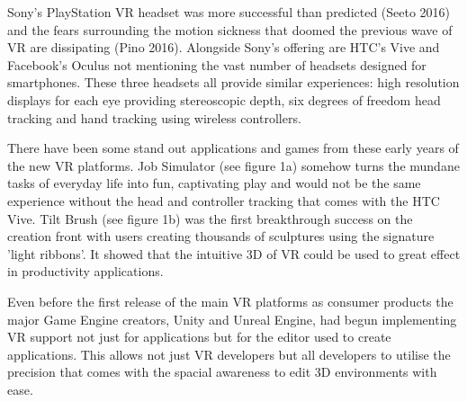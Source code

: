 \documentclass[12pt]{article}
\begin{document}
Sony's PlayStation VR headset was more successful than predicted (Seeto 2016) and the fears surrounding the motion sickness that doomed the previous wave of VR are dissipating (Pino 2016). Alongside Sony's offering are HTC's Vive and Facebook's Oculus not mentioning the vast number of headsets designed for smartphones. These three headsets all provide similar experiences: high resolution displays for each eye providing stereoscopic depth, six degrees of freedom head tracking and hand tracking using wireless controllers. 

There have been some stand out applications and games from these early years of the new VR platforms. Job Simulator (see figure 1a) somehow turns the mundane tasks of everyday life into fun, captivating play and would not be the same experience without the head and controller tracking that comes with the HTC Vive. Tilt Brush (see figure 1b) was the first breakthrough success on the creation front with users creating thousands of sculptures using the signature 'light ribbons'. It showed that the intuitive 3D of VR could be used to great effect in productivity applications.

Even before the first release of the main VR platforms as consumer products the major Game Engine creators, Unity and Unreal Engine, had begun implementing VR support not just for applications but for the editor used to create applications. This allows not just VR developers but all developers to utilise the precision that comes with the spacial awareness to edit 3D environments with ease.
\end{document}
